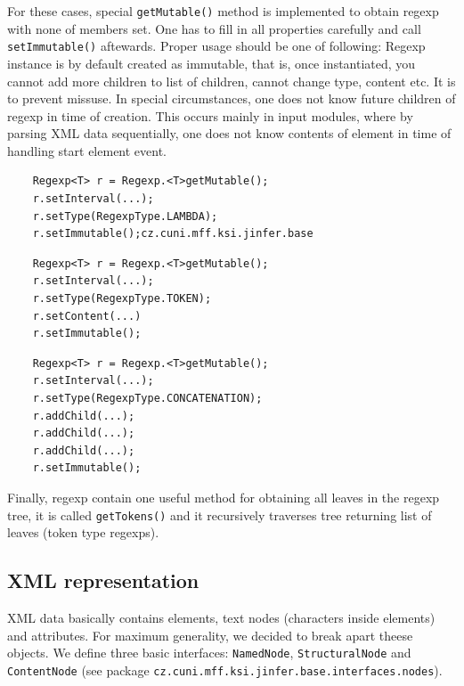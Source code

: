 \documentclass[a4paper,10pt,oneside]{article}
\newcommand{\code}[1]{\texttt{#1}}
\begin{document}
For these cases, special \code{getMutable()} method is implemented to obtain regexp with none of members set. One has to fill in all properties carefully and call \code{setImmutable()} aftewards. Proper usage should be one of following:
Regexp instance is by default created as immutable, that is, once instantiated, you cannot add more children to list of children, cannot change type, content etc. It is to prevent missuse. In special circumstances, one does not know future children of regexp in time of creation. This occurs mainly in input modules, where by parsing XML data sequentially, one does not know contents of element in time of handling start element event.
\begin{verbatim}
	Regexp<T> r = Regexp.<T>getMutable();
	r.setInterval(...);
	r.setType(RegexpType.LAMBDA);
	r.setImmutable();cz.cuni.mff.ksi.jinfer.base
\end{verbatim}
\begin{verbatim}
	Regexp<T> r = Regexp.<T>getMutable();
	r.setInterval(...);
	r.setType(RegexpType.TOKEN);
	r.setContent(...)
	r.setImmutable();
\end{verbatim}
\begin{verbatim}
	Regexp<T> r = Regexp.<T>getMutable();
	r.setInterval(...);
	r.setType(RegexpType.CONCATENATION);
	r.addChild(...);
	r.addChild(...);
	r.addChild(...);
	r.setImmutable();
\end{verbatim}
	
Finally, regexp contain one useful method for obtaining all leaves in the regexp tree, it is called \code{getTokens()} and it recursively traverses tree returning list of leaves (token type regexps).

\subsection{XML representation}
XML data basically contains elements, text nodes (characters inside elements) and attributes.
For maximum generality, we decided to break apart theese objects.
We define three basic interfaces: \code{NamedNode}, \code{StructuralNode} and \code{ContentNode} (see package \code{cz.cuni.mff.ksi.jinfer.base.interfaces.nodes}). 
\end{document}
